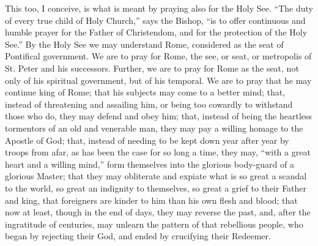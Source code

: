 This too, I conceive, is what is meant by praying also
for the Holy See. ``The duty of every true child of
Holy Church,'' says the Bishop, ``is to offer
continuous and humble prayer for the Father of
Christendom, and for the protection of the Holy
See.'' By the Holy See we may understand Rome,
considered as the seat of Pontifical government. We are
to pray for Rome, the see, or seat, or metropolis of St.
Peter and his successors. Further, we are to pray for
Rome as the seat, not only of his spiritual government,
but of his temporal. We are to pray that he may continue
king of Rome; that his subjects may come to a better
mind; that, instead of threatening and assailing him, or
being too cowardly to withstand those who do, they may
defend and obey him; that, instead of being the heartless
tormentors of an old and venerable man, they may pay a
willing homage to the Apostle of God; that, instead of
needing to be kept down year after year by troops from
afar, as has been the case for so long a time, they may,
``with a great heart and a willing mind,'' form
themselves into the glorious body-guard of a
glorious Master; that they may obliterate and expiate
what is so great a scandal to the world, so great an
indignity to themselves, so great a grief to their Father and king, that foreigners are kinder to him than his own
flesh and blood; that now at least, though in the end of
days, they may reverse the past, and, after the
ingratitude of centuries, may unlearn the pattern of that
rebellious people, who began by rejecting their God, and
ended by crucifying their Redeemer.

